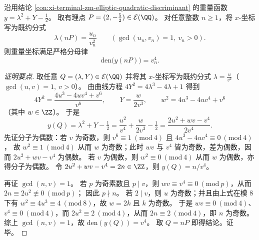 \begin{conclusion}[有理点轨道与重量坐标的四次幂分母尺度]\label{con:xi-terminal-zm-elliptic-denominator-fourth-power}
沿用结论 \ref{con:xi-terminal-zm-elliptic-quadratic-discriminant} 的重量函数 \(y=\lambda^{2}+Y-\tfrac12\)。
取有理点 \(P=(2,-\tfrac52)\in\mathcal{E}(\QQ)\)。
对任意整数 \(n\ge 1\)，将 \(x\)-坐标写为既约分式
\[
\lambda(nP)=\frac{u_n}{v_n^{2}}\qquad(\gcd(u_n,v_n)=1,\ v_n>0).
\]
则重量坐标满足严格分母律
\[
\mathrm{den}\bigl(y(nP)\bigr)=v_n^{4}.
\]
\end{conclusion}
\begin{proof}[证明要点]
取任意 \(Q=(\lambda,Y)\in\mathcal{E}(\QQ)\) 并将其 \(x\)-坐标写为既约分式
\(
\lambda=\frac{u}{v^{2}}
\)（\(\gcd(u,v)=1,\ v>0\)）。
由曲线方程
\(
4Y^{2}=4\lambda^{3}-4\lambda+1
\)
得到
\[
4Y^{2}=\frac{4u^{3}-4uv^{4}+v^{6}}{v^{6}},
\qquad
Y=\frac{w}{2v^{3}},
\qquad
w^{2}=4u^{3}-4uv^{4}+v^{6}
\]
（其中 \(w\in\ZZ\)）。
于是
\[
y(Q)=\lambda^{2}+Y-\tfrac12
=\frac{u^{2}}{v^{4}}+\frac{w}{2v^{3}}-\tfrac12
=\frac{2u^{2}+wv-v^{4}}{2v^{4}}.
\]
先证分子为偶数：若 \(v\) 为奇数，则 \(v^{6}\equiv 1\ (\mathrm{mod}\ 4)\) 且 \(4u^{3}-4uv^{4}\equiv 0\ (\mathrm{mod}\ 4)\)，
故 \(w^{2}\equiv 1\ (\mathrm{mod}\ 4)\) 从而 \(w\) 为奇数；此时 \(wv\) 与 \(v^{4}\) 皆为奇数，差为偶数，因而 \(2u^{2}+wv-v^{4}\) 为偶数。
若 \(v\) 为偶数，则 \(w^{2}\equiv 0\ (\mathrm{mod}\ 4)\) 从而 \(w\) 为偶数，亦得分子为偶数。
令 \(2u^{2}+wv-v^{4}=2n\in\ZZ\)，则 \(y(Q)=n/v^{4}\)。
\par
再证 \(\gcd(n,v)=1\)。
若 \(p\) 为奇素数且 \(p\mid v\)，则 \(wv\equiv v^{4}\equiv 0\ (\mathrm{mod}\ p)\)，从而
\(
2n\equiv 2u^{2}\not\equiv 0\ (\mathrm{mod}\ p)
\)；
因此 \(p\nmid n\)。
若 \(2\mid v\)，则 \(u\) 为奇数；并且由上式在模 \(8\) 下有
\(
w^{2}\equiv 4u^{3}\equiv 4\ (\mathrm{mod}\ 8)
\)，故 \(w=2k\) 且 \(k\) 为奇数。
于是 \(wv\equiv 0\ (\mathrm{mod}\ 4)\)、\(v^{4}\equiv 0\ (\mathrm{mod}\ 4)\)，而 \(2u^{2}\equiv 2\ (\mathrm{mod}\ 4)\)，从而 \(2n\equiv 2\ (\mathrm{mod}\ 4)\)，即 \(n\) 为奇数。
综上 \(\gcd(n,v)=1\)，故 \(\mathrm{den}(y(Q))=v^{4}\)。
取 \(Q=nP\) 即得结论。证毕。
\end{proof}

